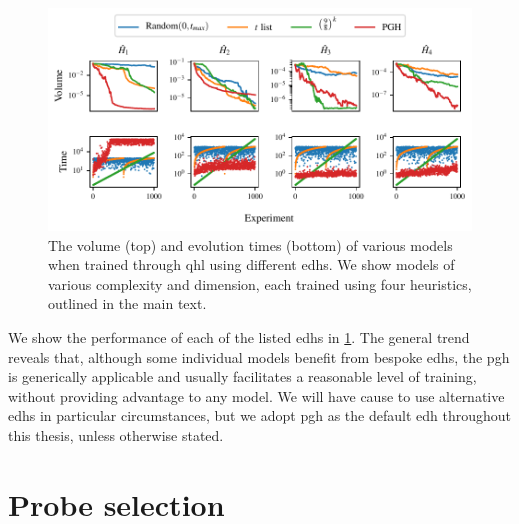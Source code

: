

\begin{figure}
    \begin{center}
        \includegraphics{algorithms/figures/heuristic_comparisons.pdf}
    \end{center}
    \caption[Effect on model training of the experiment design heuristic]{
        The \gls{volume} (top) and evolution times (bottom) of various models when trained through \gls{qhl} using different \glspl{edh}.
        We show models of various complexity and dimension, each trained using four heuristics, 
        outlined in the main text.
        \figtableref
    }
    \label{fig:heuristics_test}
\end{figure}

We show the performance of each of the listed \glspl{edh} in \cref{fig:heuristics_test}. 
The general trend reveals that, although some individual models benefit from bespoke \glspl{edh}, 
    the \gls{pgh} is generically applicable and usually facilitates a reasonable level of training, 
    without providing advantage to any model. 
We will have cause to use alternative \glspl{edh} in particular circumstances, 
    but we adopt \gls{pgh} as the default \gls{edh} throughout this thesis, 
    unless otherwise stated.

\section{Probe selection}\label{sec:probes}

